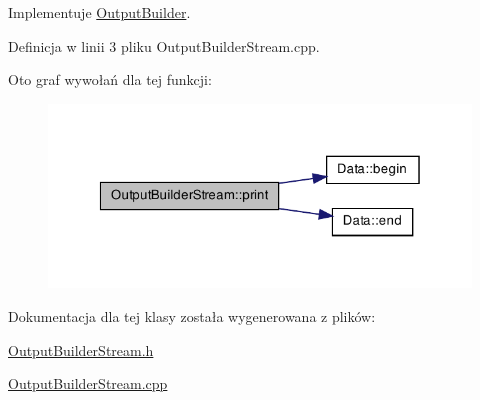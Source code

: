 \-Implementuje \hyperlink{class_output_builder_a5609a1e125b92c4d492724db53ffdf98}{\-Output\-Builder}.



\-Definicja w linii 3 pliku \-Output\-Builder\-Stream.\-cpp.



\-Oto graf wywołań dla tej funkcji\-:\nopagebreak
\begin{figure}[H]
\begin{center}
\leavevmode
\includegraphics[width=326pt]{class_output_builder_stream_a97a94cd7b144697ffbe0876da8e8e6db_cgraph}
\end{center}
\end{figure}




\-Dokumentacja dla tej klasy została wygenerowana z plików\-:\begin{DoxyCompactItemize}
\item 
\hyperlink{_output_builder_stream_8h}{\-Output\-Builder\-Stream.\-h}\item 
\hyperlink{_output_builder_stream_8cpp}{\-Output\-Builder\-Stream.\-cpp}\end{DoxyCompactItemize}
